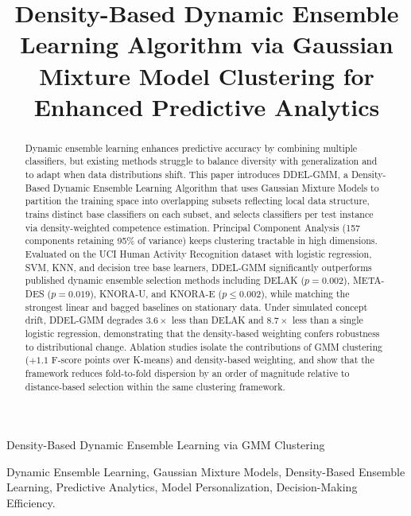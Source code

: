 \documentclass[lettersize,journal]{IEEEtran}
\begin{document}
	\title{Density-Based Dynamic Ensemble Learning Algorithm via Gaussian Mixture Model Clustering for Enhanced Predictive Analytics}
	\author{}
	
		{Density-Based Dynamic Ensemble Learning via GMM Clustering}
	
	\maketitle
	\begin{abstract}
		 Dynamic ensemble learning enhances predictive accuracy by combining multiple classifiers, but existing methods struggle to balance diversity with generalization and to adapt when data distributions shift. This paper introduces DDEL-GMM, a Density-Based Dynamic Ensemble Learning Algorithm that uses Gaussian Mixture Models to partition the training space into overlapping subsets reflecting local data structure, trains distinct base classifiers on each subset, and selects classifiers per test instance via density-weighted competence estimation. Principal Component Analysis (157 components retaining 95\% of variance) keeps clustering tractable in high dimensions. Evaluated on the UCI Human Activity Recognition dataset with logistic regression, SVM, KNN, and decision tree base learners, DDEL-GMM significantly outperforms published dynamic ensemble selection methods including DELAK ($p = 0.002$), META-DES ($p = 0.019$), KNORA-U, and KNORA-E ($p \leq 0.002$), while matching the strongest linear and bagged baselines on stationary data. Under simulated concept drift, DDEL-GMM degrades $3.6\times$ less than DELAK and $8.7\times$ less than a single logistic regression, demonstrating that the density-based weighting confers robustness to distributional change. Ablation studies isolate the contributions of GMM clustering ($+1.1$ F-score points over K-means) and density-based weighting, and show that the framework reduces fold-to-fold dispersion by an order of magnitude relative to distance-based selection within the same clustering framework.
	\end{abstract}
	
	\begin{IEEEkeywords}
		Dynamic Ensemble Learning, Gaussian Mixture Models, Density-Based Ensemble Learning, Predictive Analytics, Model Personalization, Decision-Making Efficiency.
	\end{IEEEkeywords}
	
\end{document}
